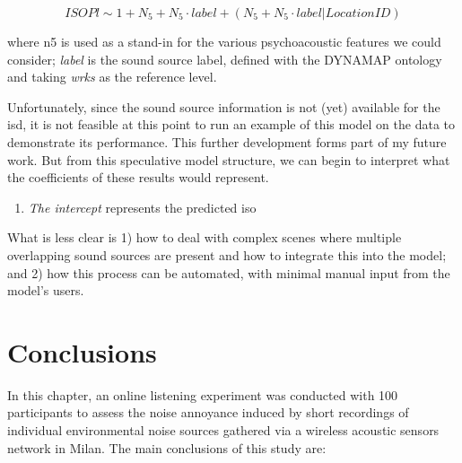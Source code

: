 \begin{equation}
  \label{eqn:integSource}
      ISOPl \sim 1 + N_5 + N_5 \cdot label + (N_5 + N_5 \cdot label | LocationID)
  \end{equation}

where \gls{n5} is used as a stand-in for the various psychoacoustic features we could consider; \emph{label} is the sound source label, defined with the DYNAMAP ontology and taking \emph{wrks} as the reference level.

Unfortunately, since the sound source information is not (yet) available for the \gls{isd}, it is not feasible at this point to run an example of this model on the data to demonstrate its performance. This further development forms part of my future work. But from this speculative model structure, we can begin to interpret what the coefficients of these results would represent. 

\begin{enumerate}
  \item \emph{The intercept} represents the predicted \gls{iso}
\end{enumerate}

What is less clear is 1) how to deal with complex scenes where multiple overlapping sound sources are present and how to integrate this into the model; and 2) how this process can be automated, with minimal manual input from the model's users. %







\section{Conclusions}

In this chapter, an online listening experiment was conducted with 100 participants to assess the noise annoyance induced by short recordings of individual environmental noise sources gathered via a wireless acoustic sensors network in Milan. The main conclusions of this study are:


